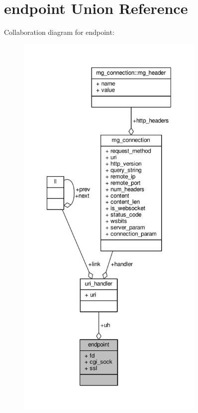 \hypertarget{unionendpoint}{}\section{endpoint Union Reference}
\label{unionendpoint}


Collaboration diagram for endpoint\+:
\nopagebreak
\begin{figure}[H]
\begin{center}
\leavevmode
\includegraphics[height=550pt]{d9/d97/unionendpoint__coll__graph}
\end{center}
\end{figure}

